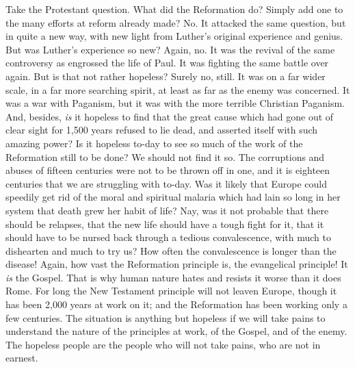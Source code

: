 \documentclass[12pt,a5paper,twoside]{book}
\begin{document}
Take the Protestant question. What did the 
Reformation do? Simply add one to the many efforts 
at reform already made? No. It attacked the same 
question, but in quite a new way, with new light from 
Luther's original experience and genius. But was 
Luther's experience so new? Again, no. It was the 
revival of the same controversy as engrossed the life 
of Paul. It was fighting the same battle over again. 
But is that not rather hopeless? Surely no, still. It 
was on a far wider scale, in a far more searching spirit, 
at least as far as the enemy was concerned. It was a 
war with Paganism, but it was with the more terrible 
Christian Paganism. And, besides, \textit{is} it hopeless to 
find that the great cause which had gone out of clear 
sight for 1,500 years refused to lie dead, and asserted 
itself with such amazing power? Is it hopeless to-day 
to see so much of the work of the Reformation 
still to be done? We should not find it so. The 
corruptions and abuses of fifteen centuries were not 
to be thrown off in one, and it is eighteen centuries 
that we are struggling with to-day. Was it likely 
that Europe could speedily get rid of the moral and 
spiritual malaria which had lain so long in her system 
that death grew her habit of life? Nay, was it not 
probable that there should be relapses, that the new 
life should have a tough fight for it, that it should 
have to be nursed back through a tedious convalescence,
with much to dishearten and much to try us? 
How often the convalescence is longer than the 
disease! Again, how vast the Reformation principle 
is, the evangelical principle! It \textit{is} the Gospel. That 
is why human nature hates and resists it worse than it 
does Rome. For long the New Testament principle 
will not leaven Europe, though it has been 2,000 years 
at work on it; and the Reformation has been working 
only a few centuries. The situation is anything but 
hopeless if we will take pains to understand the 
nature of the principles at work, of the Gospel, and 
of the enemy. The hopeless people are the people 
who will not take pains, who are not in earnest. 
\end{document}
